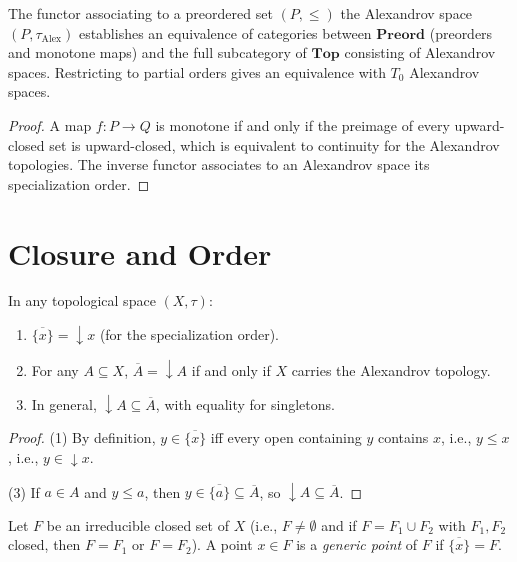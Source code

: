 \begin{proposition}
The functor associating to a preordered set $(P,\leq)$ the Alexandrov space
$(P, \tau_{\mathrm{Alex}})$ establishes an equivalence of categories between
$\mathbf{Preord}$ (preorders and monotone maps) and the full subcategory of
$\mathbf{Top}$ consisting of Alexandrov spaces. Restricting to partial orders gives an
equivalence with $T_0$ Alexandrov spaces.
\end{proposition}

\begin{proof}
A map $f\colon P \to Q$ is monotone if and only if the preimage of every upward-closed set
is upward-closed, which is equivalent to continuity for the Alexandrov topologies. The
inverse functor associates to an Alexandrov space its specialization order.
\end{proof}

\section{Closure and Order}

\begin{proposition}
In any topological space $(X,\tau)$:
\begin{enumerate}
  \item $\overline{\{x\}} = \downarrow\! x$ (for the specialization order).
  \item For any $A \subseteq X$, $\overline{A} = \downarrow\! A$ if and only if $X$
    carries the Alexandrov topology.
  \item In general, $\downarrow\! A \subseteq \overline{A}$, with equality for singletons.
\end{enumerate}
\end{proposition}

\begin{proof}
(1) By definition, $y \in \overline{\{x\}}$ iff every open containing $y$ contains $x$,
i.e., $y \leq x$, i.e., $y \in \downarrow\! x$.

(3) If $a \in A$ and $y \leq a$, then $y \in \overline{\{a\}} \subseteq \overline{A}$,
so $\downarrow\! A \subseteq \overline{A}$.
\end{proof}

\begin{definition}
Let $F$ be an irreducible closed set of $X$ (i.e., $F \neq \emptyset$ and if
$F = F_1 \cup F_2$ with $F_1, F_2$ closed, then $F = F_1$ or $F = F_2$). A point
$x \in F$ is a \emph{generic point} of $F$ if $\overline{\{x\}} = F$.
\end{definition}

